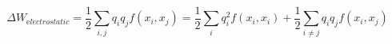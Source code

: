 \begin{equation}
{\Delta}W_{\mathrm electrostatic} = 
\frac{1}{2} \sum_{i,j}q_{i}q_{j}f(x_{i},x_{j}) = 
\frac{1}{2} \sum_{i}q^{2}_{i}f(x_{i},x_{i}) + \frac{1}{2} \sum_{i \neq j}q_{i}q_{j}f(x_{i},x_{j}) 
\end{equation}
